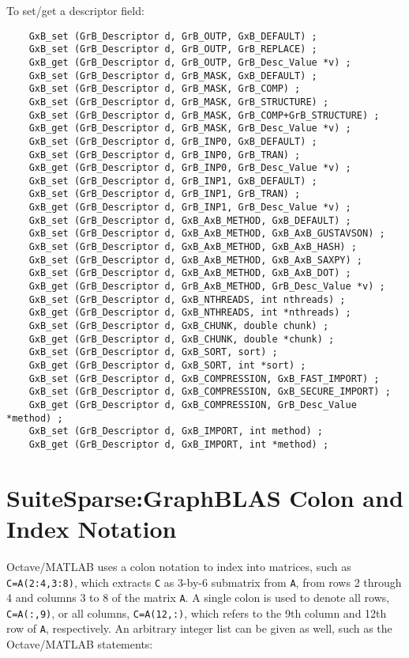\documentclass[12pt]{article}
\begin{document}
\noindent
To set/get a descriptor field:

    {\footnotesize
    \begin{verbatim}
    GxB_set (GrB_Descriptor d, GrB_OUTP, GxB_DEFAULT) ;
    GxB_set (GrB_Descriptor d, GrB_OUTP, GrB_REPLACE) ;
    GxB_get (GrB_Descriptor d, GrB_OUTP, GrB_Desc_Value *v) ;
    GxB_set (GrB_Descriptor d, GrB_MASK, GxB_DEFAULT) ;
    GxB_set (GrB_Descriptor d, GrB_MASK, GrB_COMP) ;
    GxB_set (GrB_Descriptor d, GrB_MASK, GrB_STRUCTURE) ;
    GxB_set (GrB_Descriptor d, GrB_MASK, GrB_COMP+GrB_STRUCTURE) ;
    GxB_get (GrB_Descriptor d, GrB_MASK, GrB_Desc_Value *v) ;
    GxB_set (GrB_Descriptor d, GrB_INP0, GxB_DEFAULT) ;
    GxB_set (GrB_Descriptor d, GrB_INP0, GrB_TRAN) ;
    GxB_get (GrB_Descriptor d, GrB_INP0, GrB_Desc_Value *v) ;
    GxB_set (GrB_Descriptor d, GrB_INP1, GxB_DEFAULT) ;
    GxB_set (GrB_Descriptor d, GrB_INP1, GrB_TRAN) ;
    GxB_get (GrB_Descriptor d, GrB_INP1, GrB_Desc_Value *v) ;
    GxB_set (GrB_Descriptor d, GxB_AxB_METHOD, GxB_DEFAULT) ;
    GxB_set (GrB_Descriptor d, GxB_AxB_METHOD, GxB_AxB_GUSTAVSON) ;
    GxB_set (GrB_Descriptor d, GxB_AxB_METHOD, GxB_AxB_HASH) ;
    GxB_set (GrB_Descriptor d, GxB_AxB_METHOD, GxB_AxB_SAXPY) ;
    GxB_set (GrB_Descriptor d, GxB_AxB_METHOD, GxB_AxB_DOT) ;
    GxB_get (GrB_Descriptor d, GrB_AxB_METHOD, GrB_Desc_Value *v) ;
    GxB_set (GrB_Descriptor d, GxB_NTHREADS, int nthreads) ;
    GxB_get (GrB_Descriptor d, GxB_NTHREADS, int *nthreads) ;
    GxB_set (GrB_Descriptor d, GxB_CHUNK, double chunk) ;
    GxB_get (GrB_Descriptor d, GxB_CHUNK, double *chunk) ;
    GxB_set (GrB_Descriptor d, GxB_SORT, sort) ;
    GxB_get (GrB_Descriptor d, GxB_SORT, int *sort) ;
    GxB_set (GrB_Descriptor d, GxB_COMPRESSION, GxB_FAST_IMPORT) ;
    GxB_set (GrB_Descriptor d, GxB_COMPRESSION, GxB_SECURE_IMPORT) ;
    GxB_get (GrB_Descriptor d, GxB_COMPRESSION, GrB_Desc_Value *method) ;
    GxB_set (GrB_Descriptor d, GxB_IMPORT, int method) ;
    GxB_get (GrB_Descriptor d, GxB_IMPORT, int *method) ; \end{verbatim} }

\newpage
\section{SuiteSparse:GraphBLAS Colon and Index Notation} %
\label{colon}

Octave/MATLAB uses a colon notation to index into matrices, such as
\verb'C=A(2:4,3:8)', which extracts \verb'C' as 3-by-6 submatrix from \verb'A',
from rows 2 through 4 and columns 3 to 8 of the matrix \verb'A'.  A single
colon is used to denote all rows, \verb'C=A(:,9)', or all columns,
\verb'C=A(12,:)', which refers to the 9th column and 12th row of \verb'A',
respectively.  An arbitrary integer list can be given as well, such as the
Octave/MATLAB statements:
\end{document}

